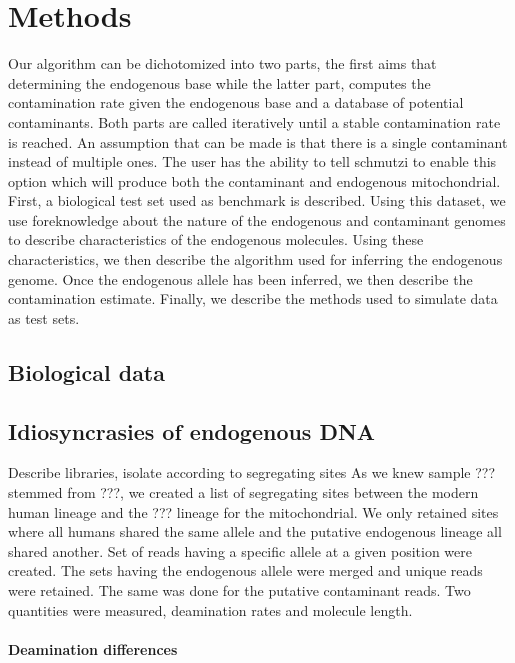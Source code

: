 \documentclass[a4paper,12pt]{article}
\begin{document}
\section{Methods}

Our algorithm can be dichotomized into two parts, the first aims that determining the endogenous base while the latter part, computes the contamination rate given the endogenous base and a database of potential contaminants. Both parts are called iteratively until a stable contamination rate is reached. An assumption that can be made is that there is a single contaminant instead of multiple ones. The user has the ability to tell schmutzi to enable this option which will produce both the contaminant and endogenous mitochondrial. First, a biological test set used as benchmark is described. Using this dataset, we use foreknowledge about the nature of the endogenous and contaminant genomes to describe characteristics of the endogenous molecules. Using these characteristics, we then describe the algorithm used for inferring the endogenous genome. Once the endogenous allele has been inferred, we then describe the contamination estimate. Finally, we describe the methods used to simulate data as test sets.


\subsection{Biological data}



\subsection{Idiosyncrasies of endogenous DNA}
\label{seq:endodeampattern}
Describe libraries, isolate according to segregating sites
As we knew sample ??? stemmed from ???, we created a list of segregating sites between the modern human lineage and the ??? lineage for the mitochondrial. We only retained sites where all humans shared the same allele and the putative endogenous lineage all shared another. Set of reads having a specific allele at a given position were created. The sets having the endogenous allele were merged and unique reads were retained. The same was done for the putative contaminant reads. Two quantities were measured, deamination rates and molecule length. 

\noindent \paragraph{Deamination differences}
\end{document}
